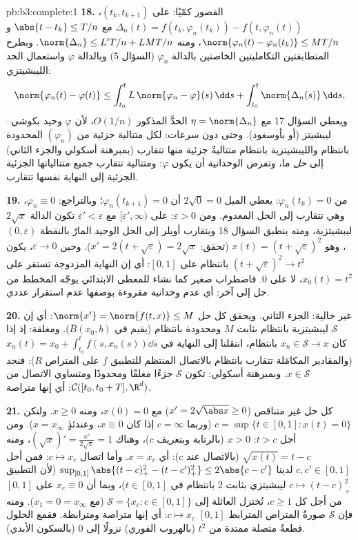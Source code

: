 \begin{solution}{pb:b3:complete:1}
\textbf{18.} القصور كمّيًا: على $(t_k, t_{k+1})$،
$\Delta_n(t) = f(t_k, \varphi_n(t_k)) - f(t, \varphi_n(t))$
مع $\abs{t - t_k} \leq T/n$ و $\norm{\varphi_n(t) -
\varphi_n(t_k)} \leq MT/n$، ومنه $\norm{\Delta_n} \leq L'T/n +
LMT/n$. وبطرح المتطابقتين
التكامليتين الخاصتين بالدالة $\varphi_n$ (السؤال 5) وبالدالة $\varphi$
واستعمال الحد الليبشيتزي:
\[
\norm{\varphi_n(t) - \varphi(t)} \leq
\int_{t_0}^t L\,\norm{\varphi_n - \varphi}(s)\,\dd s +
\int_{t_0}^t\norm{\Delta_n(s)}\,\dd s,
\]
ويعطي السؤال 17 مع $\eta = \norm{\Delta_n}$ الحدَّ المذكور $O(1/n)$، لأن
$\varphi$ وحيد بكوشي--ليبشيتز (أو بأوسغود). وحتى دون سرعات:
لكل متتالية جزئية من $(\varphi_n)$ المحدودة بانتظام
والليبشيتزية بانتظام متتاليةٌ جزئية منها تتقارب (بمبرهنة
أسكولي والجزء الثاني) إلى \emph{حل} ما، وتفرض الوحدانية أن
يكون $\varphi$: ومتتالية تتقارب جميع متتالياتها الجزئية
الجزئية إلى النهاية نفسها تتقارب.

\textbf{19.} من $\varphi_n(t_k) = 0$: يعطي الميل $2\sqrt0 =
0$ أن $\varphi_n(t_{k+1}) = 0$؛
وبالتراجع: $\varphi_n
\equiv 0$، وهي تتقارب إلى الحل المعدوم. ومن $\varepsilon > 0$:
على $[\varepsilon', \infty)$ مع $\varepsilon' < \varepsilon$ تكون الدالة $2\sqrt x$ ليبشيتزية، ومنه
ينطبق السؤال 18 ويتقارب أويلر إلى الحل الوحيد المارّ بالنقطة
$(0, \varepsilon)$، وهو $x(t) =
(t + \sqrt\varepsilon)^2$ (تحقق: $x' = 2(t + \sqrt
\varepsilon) = 2\sqrt x$). وحين $\varepsilon \to 0$، يكون
$(t +
\sqrt\varepsilon)^2 \to t^2$ بانتظام على $[0,1]$: أي إن النهاية المزدوجة تستقر على
$x_0(t) = t^2$، لا على $0$. فاضطراب صغير كما نشاء للمعطى
الابتدائي يوجّه المخطط من حل إلى آخر: أي عدم وحدانية مقروءة
بوصفها عدم استقرار عددي.

\textbf{20.} غير خالية: الجزء الثاني. ويحقق كل حل $\norm{x'} = \norm{f(t, x)} \leq M$: أي
إن $\mathcal S$ ليبشيتزية بانتظام بثابت $M$ ومحدودة بانتظام
(بقيم في $\bar B(x_0, b)$). ومغلقة: إذ إذا كان $x_n \in \mathcal S \to x$ بانتظام،
انتقلنا إلى النهاية في $x_n(t) = x_0 +
\int_{t_0}^tf(s, x_n(s))\dd s$ (والمقادير المكامَلة تتقارب
بانتظام بالاتصال المنتظم للتطبيق $f$ على المتراص $R$): فنجد
$x \in \mathcal S$. وبمبرهنة أسكولي: تكون $\mathcal S$ جزءًا مغلقًا
ومحدودًا ومتساوي الاتصال من $\mathcal C([t_0, t_0+T],
\R^d)$: أي إنها متراصة.

\textbf{21.} كل حل غير متناقص ($x' = 2\sqrt{\abs
x} \geq 0$) مع $x(0) = 0$، ومنه
$x \geq 0$. ولتكن $c =
\sup\{t \in [0,1] : x(t) = 0\}$ (وربما $c = \infty$ إذا كان
$x \equiv 0$، وعندئذٍ $x = x_\infty$). ومن أجل $t > c$: $x
> 0$
(بالرتابة وبتعريف $c$)، وهناك $(\sqrt
x)' = \frac{x'}{2\sqrt x} = 1$، ومنه $\sqrt{x(t)} = t - c$ (بالاتصال
عند $c$): أي $x = x_c$. وأما اتصال $c \mapsto
x_c$: فمن أجل $c, c' \in [0, 1]$
لدينا $\sup_{[0,1]}\abs{(t - c)_+^2 -
(t - c')_+^2} \leq 2\abs{c - c'}$ (لأن التطبيق $c \mapsto
(t-c)_+^2$ ليبشيتزي بثابت $2$ بانتظام
في $t \in [0,1]$)، وبما أن $x_c \equiv 0$ على $[0,1]$ من أجل
كل $c \geq 1$، تُختزل العائلة إلى $\mathcal S = \{x_c : c \in [0,1]\}$ (مع $x_1 = 0 = x_\infty$). ومنه
فإن $\mathcal S$ صورةُ المتراص المترابط $[0,1]$ 
$c
\mapsto x_c$: أي إنها متراصة ومترابطة. فقمع الحلول قطعةٌ متصلة
ممتدة من $t^2$ (بالهروب الفوري) نزولًا إلى $0$ (بالسكون
الأبدي).


\end{solution}
